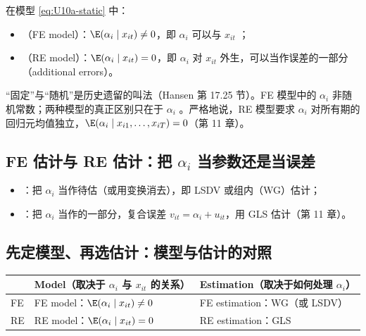 \begin{defn}[FE 模型与 RE 模型]\label{def:U10a-feremodel}
在模型 \eqref{eq:U10a-static} 中：
\begin{itemize}
  \item {}（FE model）：$\E(\alpha_i\mid x_{it})\neq0$，即 $\alpha_i$ 可以与 $x_{it}$ ；
  \item {}（RE model）：$\E(\alpha_i\mid x_{it})=0$，即 $\alpha_i$ 对 $x_{it}$ 外生，可以当作误差的一部分（additional errors）。
\end{itemize}
\end{defn}

\begin{note}
“固定”与“随机”是历史遗留的叫法（Hansen 第 17.25 节）。FE 模型中的 $\alpha_i$ 非随机常数；两种模型的真正区别只在于 $\alpha_i$ 。严格地说，RE 模型要求 $\alpha_i$ 对所有期的回归元均值独立，$\E(\alpha_i\mid x_{i1},\dots,x_{iT})=0$（第 11 章）。
\end{note}

\subsection{FE 估计与 RE 估计：把 \texorpdfstring{$\alpha_i$}{alpha\_i} 当参数还是当误差}

\begin{defn}[FE 估计与 RE 估计]\label{def:U10a-fereest}
\begin{itemize}
  \item {}：把 $\alpha_i$ 当作待估（或用变换消去），即 LSDV 或组内（WG）估计；
  \item {}：把 $\alpha_i$ 当作的一部分，复合误差 $v_{it}=\alpha_i+u_{it}$，用 GLS 估计（第 11 章）。
\end{itemize}
\end{defn}

\subsection{先定模型、再选估计：模型与估计的对照}

\begin{center}\begin{minipage}{\linewidth}\centering
{}
\begin{tabularx}{\linewidth}{lLL}
\toprule
 & \textbf{Model}（取决于 $\alpha_i$ 与 $x_{it}$ 的关系） & \textbf{Estimation}（取决于如何处理 $\alpha_i$）\\
\midrule
FE & FE model：$\E(\alpha_i\mid x_{it})\neq0$ & FE estimation：WG（或 LSDV）\\
RE & RE model：$\E(\alpha_i\mid x_{it})=0$ & RE estimation：GLS\\
\bottomrule
\end{tabularx}
\end{minipage}\end{center}

